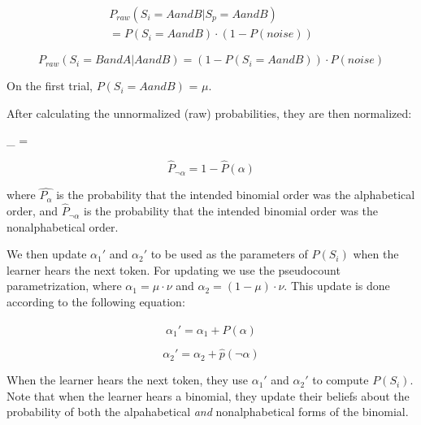 \documentclass[10pt, letterpaper]{article}
\begin{document}
\begin{multline}
\label{eq:praw}
P_{raw}(S_i = AandB|S_p = AandB) \\ = P(S_i = AandB) \cdot (1 -  P(noise))
\end{multline}

\begin{equation}
\label{eqprawtwo}
P_{raw}(S_i = BandA|AandB) = (1 - P(S_i = AandB)) \cdot P(noise)
\end{equation}

On the first trial, \(P(S_i = AandB)\) = \(\mu\).

After calculating the unnormalized (raw) probabilities, they are then
normalized:

\begin{myequation}%
\label{eq:phatalpha}
_{\alpha} =  %
\end{myequation}

\begin{equation}
\label{eq:phatnotalpha}
\hat{P}_{\neg\alpha} = 1 - \hat{P}(\alpha)
\end{equation}

\noindent where \(\hat{P_\alpha}\) is the probability that the intended
binomial order was the alphabetical order, and \(\hat{P}_{\neg\alpha}\)
is the probability that the intended binomial order was the
nonalphabetical order.

We then update \(\alpha_1'\) and \(\alpha_2'\) to be used as the
parameters of \(P(S_i)\) when the learner hears the next token. For
updating we use the pseudocount parametrization, where
\(\alpha_1 = \mu \cdot \nu\) and \(\alpha_2 = (1-\mu) \cdot \nu\). This
update is done according to the following equation:

\begin{equation}
\label{eq:alpha1}
\alpha_1' = \alpha_1 + \hat{P}(\alpha)
\end{equation}

\begin{equation}
\label{eq:alpha2}
\alpha_2' = \alpha_2 + \hat{p}(\neg\alpha)
\end{equation}

When the learner hears the next token, they use \(\alpha_1'\) and
\(\alpha_2'\) to compute \(P(S_i)\). Note that when the learner hears a
binomial, they update their beliefs about the probability of both the
alpahabetical \emph{and} nonalphabetical forms of the binomial.
\end{document}
